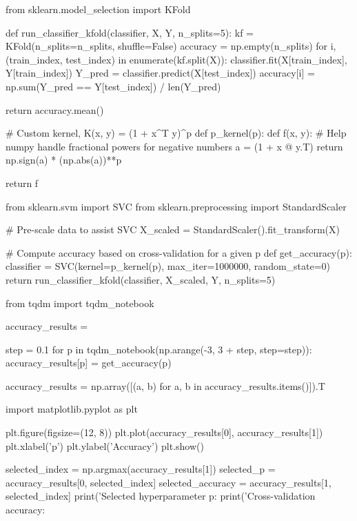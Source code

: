 \begin{python}
from sklearn.model_selection import KFold

def run_classifier_{k}fold(classifier, X, Y, n_splits=5):
    kf = KFold(n_splits=n_splits, shuffle=False)
    accuracy = np.empty(n_splits)
    for i, (train_{i}ndex, test_{i}ndex) in enumerate(kf.split(X)):
        classifier.fit(X[train_{i}ndex], Y[train_{i}ndex])
        Y_pred = classifier.predict(X[test_{i}ndex])
        accuracy[i] = np.sum(Y_pred == Y[test_{i}ndex]) / len(Y_pred)
    
    return accuracy.mean()
\end{python}

\begin{python}
# Custom kernel, K(x, y) = (1 + x^T y)^p
def p_{k}ernel(p):
    def f(x, y):
        # Help numpy handle fractional powers for negative numbers
        a = (1 + x @ y.T)
        return np.sign(a) * (np.abs(a))**p
        
    return f
\end{python}

\begin{python}
from sklearn.svm import SVC
from sklearn.preprocessing import StandardScaler

# Pre-scale data to assist SVC
X_scaled = StandardScaler().fit_transform(X)

# Compute accuracy based on cross-validation for a given p
def get_accuracy(p):
    classifier = SVC(kernel=p_{k}ernel(p), max_{i}ter=1000000, random_state=0)
    return run_classifier_{k}fold(classifier, X_scaled, Y, n_splits=5)
\end{python}

\begin{python}
from tqdm import tqdm_{n}otebook

accuracy_results = {}

step = 0.1
for p in tqdm_{n}otebook(np.arange(-3, 3 + step, step=step)):
    accuracy_results[p] = get_accuracy(p)
    
accuracy_results = np.array([(a, b) for a, b in accuracy_results.items()]).T
\end{python}

\begin{python}
import matplotlib.pyplot as plt

plt.figure(figsize=(12, 8))
plt.plot(accuracy_results[0], accuracy_results[1])
plt.xlabel('p')
plt.ylabel('Accuracy')
plt.show()

selected_{i}ndex = np.argmax(accuracy_results[1])
selected_p = accuracy_results[0, selected_{i}ndex]
selected_accuracy = accuracy_results[1, selected_{i}ndex]
print('Selected hyperparameter p: %
print('Cross-validation accuracy: %
\end{python}

